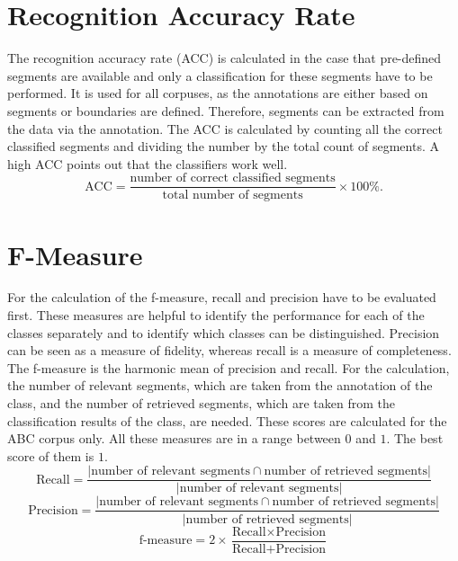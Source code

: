 \section{Recognition Accuracy Rate}
The recognition accuracy rate (ACC) is calculated in the case that pre-defined segments are available and only a classification for these segments have to be performed. It is used for all corpuses, as the annotations are either based on segments or boundaries are defined. Therefore, segments can be extracted from the data via the annotation. The ACC is calculated by counting all the correct classified segments and dividing the number by the total count of segments. A high ACC points out that the classifiers work well.
\begin{equation*}
	\textrm{ACC} = \frac{\textrm{number of correct classified segments}}{\textrm{total number of segments}} \times 100\%.
\end{equation*}

\section{F-Measure}
For the calculation of the f-measure, recall and precision have to be evaluated first. These measures are helpful to identify the performance for each of the classes separately and to identify which classes can be distinguished. Precision can be seen as a measure of fidelity, whereas recall is a measure of completeness. The f-measure is the harmonic mean of precision and recall. For the calculation, the number of relevant segments, which are taken from the annotation of the class, and the number of retrieved segments, which are taken from the classification results of the class, are needed. These scores are calculated for the ABC corpus only. All these measures are in a range between $0$ and $1$. The best score of them is $1$.
\begin{equation*}
	\textrm{Recall}=\frac{\left| \textrm{number of relevant segments} \cap \textrm{number of retrieved segments} \right|}{\left| \textrm{number of relevant segments} \right|}
\end{equation*}
\begin{equation*}
	\textrm{Precision}=\frac{\left| \textrm{number of relevant segments} \cap \textrm{number of retrieved segments} \right|}{\left| \textrm{number of retrieved segments} \right|}
\end{equation*}
\begin{equation*}
	\textrm{f-measure}=2 \times \frac{\textrm{Recall} \times \textrm{Precision}}{\textrm{Recall}+\textrm{Precision}}
\end{equation*}

